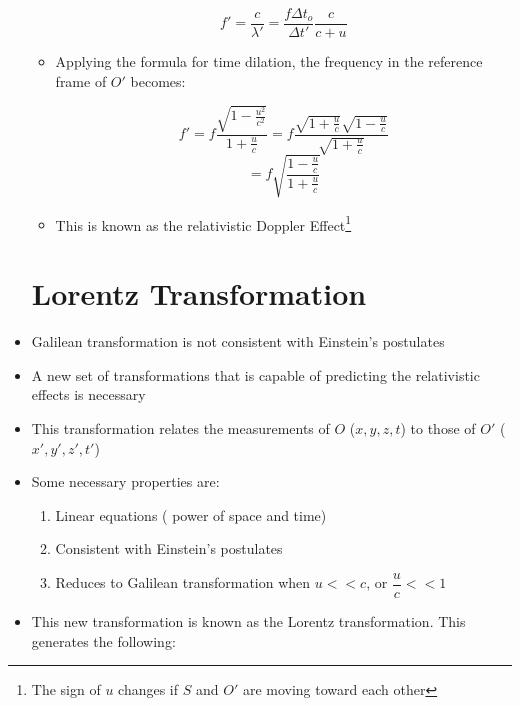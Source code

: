 \begin{itemize}
\begin{itemize}
        $$\boxed{f'=\frac{c}{\lambda'}=\frac{f\Delta t_o}{\Delta t'}\frac{c}{c+u}}$$

        \newpage

      \item Applying the formula for time dilation, the frequency in the reference frame of $O'$ becomes:

        $$f'=f\frac{\sqrt{1-\frac{u^2}{c^2}}}{1+\frac{u}{c}}=f\frac{\sqrt{1+\frac{u}{c}}\sqrt{1-\frac{u}{c}}}{\sqrt{1+\frac{u}{c}}}$$
        $$=\boxed{f\sqrt{\frac{1-\frac{u}{c}}{1+\frac{u}{c}}}}$$

      \item This is known as the relativistic Doppler Effect\footnote{The sign of $u$ changes if $S$ and $O'$ are moving toward each other}

    \end{itemize}

    \section{Lorentz Transformation}

  \item Galilean transformation is not consistent with Einstein's postulates

  \item A new set of transformations that is capable of predicting the relativistic effects is necessary

  \item This transformation relates the measurements of $O$ ($x,y,z,t$) to those of $O'$ ($x',y',z',t'$)

  \item Some necessary properties are:

    \begin{enumerate}

      \item Linear equations ( power of space and time)

      \item Consistent with Einstein's postulates
        
      \item Reduces to Galilean transformation when $u << c$, or $\dfrac{u}{c} << 1$

    \end{enumerate}

  \item This new transformation is known as the Lorentz transformation. This generates the following:


\end{itemize}
